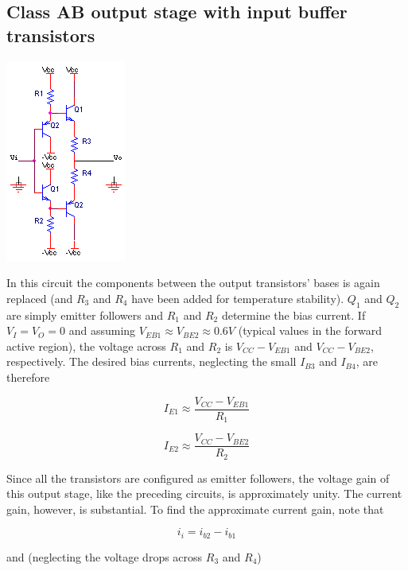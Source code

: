 \subsection{Class AB output stage with input buffer transistors}
\begin{center}
	\includegraphics{schematics/classABinputbuffers.PNG}
\end{center}
In this circuit the components between the output transistors' bases is again replaced (and $R_{3}$ and $R_{4}$ have been added for temperature stability). $Q_{1}$ and $Q_{2}$ are simply emitter followers and $R_{1}$ and $R_{2}$ determine the bias current. If $V_{I} = V_{O} = 0$ and assuming $V_{EB1} \approx V_{BE2} \approx 0.6V$ (typical values in the forward active region), the voltage across $R_{1}$ and $R_{2}$ is $V_{CC}-V_{EB1}$ and $V_{CC}-V_{BE2}$, respectively. The desired bias currents, neglecting the small $I_{B3}$ and $I_{B4}$, are therefore

\begin{equation}
I_{E1} \approx \frac{V_{CC}-V_{EB1}}{R_{1}}
\end{equation}

\begin{equation}
I_{E2} \approx \frac{V_{CC}-V_{BE2}}{R_{2}}
\end{equation}

\par
Since all the transistors are configured as emitter followers, the voltage gain of this output stage, like the preceding circuits, is approximately unity. The current gain, however, is substantial. To find the approximate current gain, note that

\begin{equation}
i_{i} = i_{b2} - i_{b1}
\end{equation}

and (neglecting the voltage drops across $R_{3}$ and $R_{4}$)

